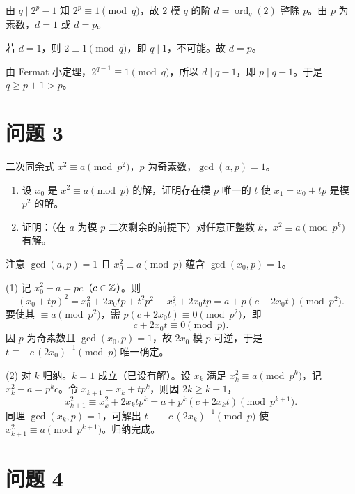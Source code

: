 \documentclass{article}
\newcommand{\ord}{\operatorname{ord}}
\begin{document}
\begin{solution}
  由 $q\mid 2^p-1$ 知 $2^p\equiv 1\pmod q$，故 $2$ 模 $q$ 的阶 $d=\ord_q(2)$ 整除 $p$。由 $p$ 为素数，$d=1$ 或 $d=p$。

  若 $d=1$，则 $2\equiv 1\pmod q$，即 $q\mid 1$，不可能。故 $d=p$。

  由 Fermat 小定理，$2^{q-1}\equiv 1\pmod q$，所以 $d\mid q-1$，即 $p\mid q-1$。于是 $q\ge p+1>p$。
\end{solution}

\section{问题 3}

二次同余式 $x^2\equiv a\pmod{p^2}$，$p$ 为奇素数，$\gcd(a,p)=1$。

\begin{enumerate}[(1)]
  \item 设 $x_0$ 是 $x^2\equiv a\pmod p$ 的解，证明存在模 $p$ 唯一的 $t$ 使 $x_1=x_0+tp$ 是模 $p^2$ 的解。
  \item 证明：（在 $a$ 为模 $p$ 二次剩余的前提下）对任意正整数 $k$，$x^2\equiv a\pmod{p^k}$ 有解。
\end{enumerate}

\begin{solution}
  注意 $\gcd(a,p)=1$ 且 $x_0^2\equiv a\pmod p$ 蕴含 $\gcd(x_0,p)=1$。

  (1) 记 $x_0^2-a=pc$（$c\in\mathbb{Z}$）。则
  \[
    (x_0+tp)^2=x_0^2+2x_0 tp+t^2p^2\equiv x_0^2+2x_0 tp = a+p(c+2x_0 t)\pmod{p^2}.
  \]
  要使其 $\equiv a\pmod{p^2}$，需 $p(c+2x_0t)\equiv 0\pmod{p^2}$，即
  \[
    c+2x_0 t\equiv 0\pmod p .
  \]
  因 $p$ 为奇素数且 $\gcd(x_0,p)=1$，故 $2x_0$ 模 $p$ 可逆，于是 $t\equiv -c\,(2x_0)^{-1}\pmod p$ 唯一确定。

  (2) 对 $k$ 归纳。$k=1$ 成立（已设有解）。设 $x_k$ 满足 $x_k^2\equiv a\pmod{p^k}$，记 $x_k^2-a=p^k c$。令 $x_{k+1}=x_k+tp^k$，则因 $2k\ge k+1$，
  \[
    x_{k+1}^2\equiv x_k^2+2x_k tp^k=a+p^k(c+2x_k t)\pmod{p^{k+1}}.
  \]
  同理 $\gcd(x_k,p)=1$，可解出 $t\equiv -c\,(2x_k)^{-1}\pmod p$ 使 $x_{k+1}^2\equiv a\pmod{p^{k+1}}$。归纳完成。
\end{solution}

\section{问题 4}
\end{document}
